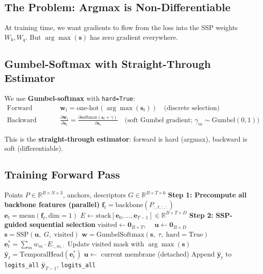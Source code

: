 \documentclass[11pt,a4paper]{article}
\begin{document}
\subsection{The Problem: Argmax is Non-Differentiable}

At training time, we want gradients to flow from the loss into the SSP weights
$W_k, W_q$.  But $\arg\max(\mathbf{s})$ has zero gradient everywhere.

\subsection{Gumbel-Softmax with Straight-Through Estimator}

We use \textbf{Gumbel-softmax} with \texttt{hard=True}:
\begin{align}
  \text{Forward pass:}& \quad
    \mathbf{w}_t = \text{one-hot}(\arg\max(\mathbf{s}_t))
    \quad \text{(discrete selection)} \\
  \text{Backward pass:}& \quad
    \frac{\partial \mathbf{w}_t}{\partial \mathbf{s}_t} =
    \frac{\partial \text{softmax}(\mathbf{s}_t + \gamma)}{\partial \mathbf{s}_t}
    \quad \text{(soft Gumbel gradient; $\gamma_m \sim \text{Gumbel}(0,1)$)}
\end{align}

This is the \textbf{straight-through estimator}: forward is hard (argmax),
backward is soft (differentiable).

\subsection{Training Forward Pass}

\begin{algorithm}[H]
\caption{ASP Training Forward Pass}
\begin{algorithmic}[1]
\Require Points $P \in \mathbb{R}^{B \times N \times 3}$, anchors, descriptors $G \in \mathbb{R}^{B \times T \times 6}$
\State \textbf{Step 1: Precompute all backbone features (parallel)}
  \State $\mathbf{f}_t = \text{backbone}(P_{:,t,:,:})$ \Comment{[B, n, D]}
  \State $\mathbf{e}_t = \text{mean}(\mathbf{f}_t, \text{dim}=1)$ \Comment{[B, D]}
\EndFor
\State $E \leftarrow \text{stack}[\mathbf{e}_0, \ldots, \mathbf{e}_{T-1}] \in \mathbb{R}^{B \times T \times D}$
\State \textbf{Step 2: SSP-guided sequential selection}
\State $\text{visited} \leftarrow \mathbf{0}_{B \times T}$, $\quad \mathbf{u} \leftarrow \mathbf{0}_{B \times D}$
  \State $\mathbf{s} = \text{SSP}(\mathbf{u},\; G,\; \text{visited})$ 
  \State $\mathbf{w} = \text{GumbelSoftmax}(\mathbf{s},\; \tau,\; \text{hard}=\text{True})$ 
  \State $\mathbf{e}_t^* = \sum_m w_m \cdot E_{:,m,:}$ 
  \State Update visited mask with $\arg\max(\mathbf{s})$
  \State $\hat{\mathbf{y}}_t = \text{TemporalHead}(\mathbf{e}_t^*)$ \Comment{[B, C]}
  \State $\mathbf{u} \leftarrow$ current membrane (detached)
  \State Append $\hat{\mathbf{y}}_t$ to \texttt{logits\_all}
\EndFor
\Return $\hat{\mathbf{y}}_{T-1}$, \texttt{logits\_all}
\end{algorithmic}
\end{algorithm}
\end{document}
